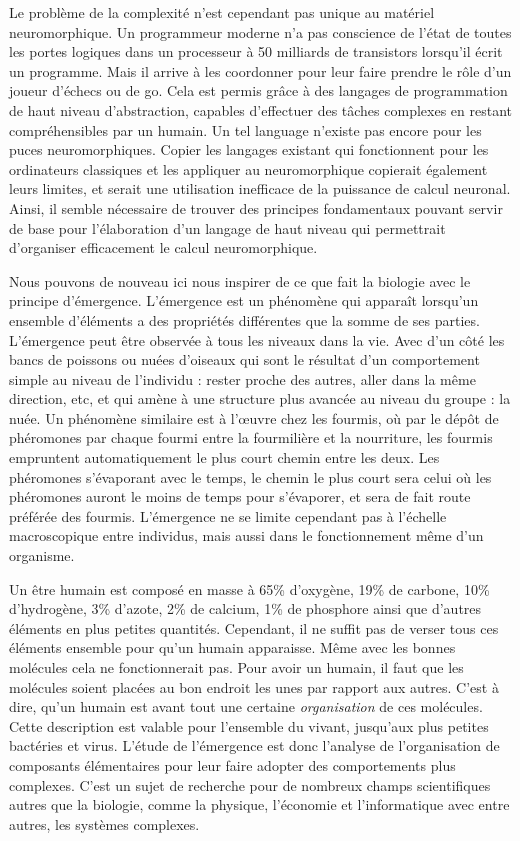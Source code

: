 	Le problème de la complexité n'est cependant pas unique au matériel neuromorphique. Un programmeur moderne n'a pas conscience de l'état de toutes les portes logiques dans un processeur à 50 milliards de transistors lorsqu'il écrit un programme. Mais il arrive à les coordonner pour leur faire prendre le rôle d'un joueur d'échecs ou de go. Cela est permis grâce à des langages de programmation de haut niveau d'abstraction, capables d'effectuer des tâches complexes en restant compréhensibles par un humain. Un tel language n'existe pas encore pour les puces neuromorphiques. Copier les langages existant qui fonctionnent pour les ordinateurs classiques et les appliquer au neuromorphique copierait également leurs limites, et serait une utilisation inefficace de la puissance de calcul neuronal. Ainsi, il semble nécessaire de trouver des principes fondamentaux pouvant servir de base pour l'élaboration d'un langage de haut niveau qui permettrait d'organiser efficacement le calcul neuromorphique.

	Nous pouvons de nouveau ici nous inspirer de ce que fait la biologie avec le principe d'émergence. L'émergence est un phénomène qui apparaît lorsqu'un ensemble d'éléments a des propriétés différentes que la somme de ses parties. L'émergence peut être observée à tous les niveaux dans la vie. Avec d'un côté les bancs de poissons ou nuées d'oiseaux qui sont le résultat d'un comportement simple au niveau de l'individu : rester proche des autres, aller dans la même direction, etc, et qui amène à une structure plus avancée au niveau du groupe : la nuée. Un phénomène similaire est à l'œuvre chez les fourmis, où par le dépôt de phéromones par chaque fourmi entre la fourmilière et la nourriture, les fourmis empruntent automatiquement le plus court chemin entre les deux. Les phéromones s'évaporant avec le temps, le chemin le plus court sera celui où les phéromones auront le moins de temps pour s'évaporer, et sera de fait route préférée des fourmis. L'émergence ne se limite cependant pas à l'échelle macroscopique entre individus, mais aussi dans le fonctionnement même d'un organisme.

	Un être humain est composé en masse à 65\% d'oxygène, 19\% de carbone, 10\% d'hydrogène, 3\% d'azote, 2\% de calcium, 1\% de phosphore ainsi que d'autres éléments en plus petites quantités. Cependant, il ne suffit pas de verser tous ces éléments ensemble pour qu'un humain apparaisse. Même avec les bonnes molécules cela ne fonctionnerait pas. Pour avoir un humain, il faut que les molécules soient placées au bon endroit les unes par rapport aux autres. C'est à dire, qu'un humain est avant tout une certaine \textit{organisation} de ces molécules. Cette description est valable pour l'ensemble du vivant, jusqu'aux plus petites bactéries et virus. L'étude de l'émergence est donc l'analyse de l'organisation de composants élémentaires pour leur faire adopter des comportements plus complexes. C'est un sujet de recherche pour de nombreux champs scientifiques autres que la biologie, comme la physique, l'économie et l'informatique avec entre autres, les systèmes complexes.

